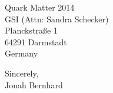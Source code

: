 \documentclass[letterpaper,10pt]{letter}
\begin{document}
\begin{letter}{
  Quark Matter 2014 \\
  GSI (Attn: Sandra Schecker) \\
  Planckstra\ss e 1 \\
  64291 Darmstadt \\
  Germany
}
\closing{Sincerely, \\ Jonah Bernhard}



\end{letter}
\end{document}

